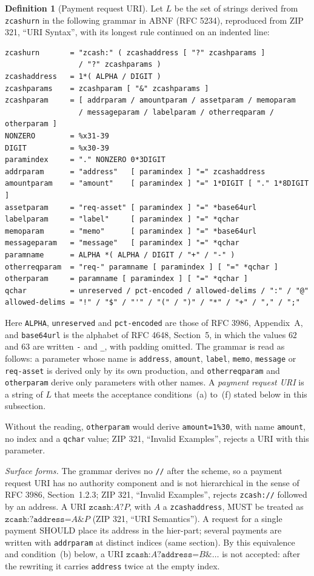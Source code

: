 \documentclass[11pt,a4paper]{article}
\theoremstyle{definition}
\newtheorem{definition}[theorem]{Definition}
\begin{document}
\begin{definition}[Payment request URI]\label{def:zip321-request}
Let $L$ be the set of strings derived from \texttt{zcashurn} in the
following grammar in ABNF (RFC 5234), reproduced from ZIP 321, ``URI
Syntax'', with its longest rule continued on an indented line:
{\small
\begin{verbatim}
zcashurn       = "zcash:" ( zcashaddress [ "?" zcashparams ]
                 / "?" zcashparams )
zcashaddress   = 1*( ALPHA / DIGIT )
zcashparams    = zcashparam [ "&" zcashparams ]
zcashparam     = [ addrparam / amountparam / assetparam / memoparam
                 / messageparam / labelparam / otherreqparam / otherparam ]
NONZERO        = %x31-39
DIGIT          = %x30-39
paramindex     = "." NONZERO 0*3DIGIT
addrparam      = "address"   [ paramindex ] "=" zcashaddress
amountparam    = "amount"    [ paramindex ] "=" 1*DIGIT [ "." 1*8DIGIT ]
assetparam     = "req-asset" [ paramindex ] "=" *base64url
labelparam     = "label"     [ paramindex ] "=" *qchar
memoparam      = "memo"      [ paramindex ] "=" *base64url
messageparam   = "message"   [ paramindex ] "=" *qchar
paramname      = ALPHA *( ALPHA / DIGIT / "+" / "-" )
otherreqparam  = "req-" paramname [ paramindex ] [ "=" *qchar ]
otherparam     = paramname [ paramindex ] [ "=" *qchar ]
qchar          = unreserved / pct-encoded / allowed-delims / ":" / "@"
allowed-delims = "!" / "$" / "'" / "(" / ")" / "*" / "+" / "," / ";"
\end{verbatim}}
\noindent Here \texttt{ALPHA}, \texttt{unreserved} and \texttt{pct-encoded}
are those of RFC 3986, Appendix~A, and \texttt{base64url} is the alphabet of
RFC 4648, Section~5, in which the values $62$ and $63$ are written
\texttt{-} and \texttt{\_}, with padding omitted. The grammar is read as
follows: a parameter whose name is \texttt{address}, \texttt{amount},
\texttt{label}, \texttt{memo}, \texttt{message} or \texttt{req-asset} is
derived only by its own production, and \texttt{otherreqparam} and
\texttt{otherparam} derive only parameters with other names. A
\emph{payment request URI} is a string of $L$ that meets the acceptance
conditions~(a) to~(f) stated below in this subsection.
\end{definition}

Without the reading, \texttt{otherparam} would derive
\texttt{amount=1\%30}, with name \texttt{amount}, no index and a
\texttt{qchar} value; ZIP 321, ``Invalid Examples'', rejects a URI with
this parameter.

\emph{Surface forms.} The grammar derives no \texttt{//} after the scheme,
so a payment request URI has no authority component and is not
hierarchical in the sense of RFC 3986, Section~1.2.3; ZIP 321, ``Invalid
Examples'', rejects \texttt{zcash://} followed by an address. A URI
$\texttt{zcash:}A\texttt{?}P$, with $A$ a \texttt{zcashaddress}, MUST be
treated as $\texttt{zcash:?address=}A\texttt{\&}P$ (ZIP 321, ``URI
Semantics''). A request for a single payment SHOULD place its address in
the hier-part; several payments are written with \texttt{addrparam} at
distinct indices (same section). By this equivalence and condition~(b)
below, a URI $\texttt{zcash:}A\texttt{?address=}B\texttt{\&}\dots$ is not
accepted: after the rewriting it carries \texttt{address} twice at the empty
index.
\end{document}
